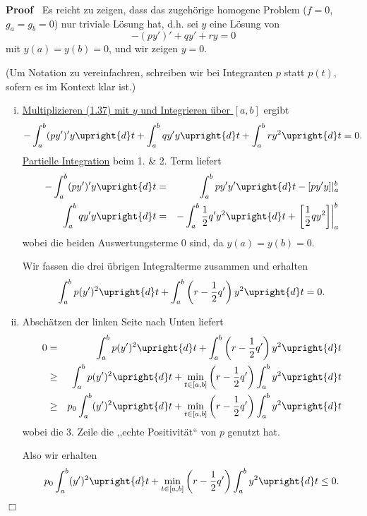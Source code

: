\documentclass{book}
\newcommand{\nobracket}{}
\newenvironment{enumerateroman}{\begin{enumerate}[i.] }{\end{enumerate}}
\newenvironment{proof}{\noindent\textbf{Proof\ }}{\hspace*{\fill}$\Box$\medskip}
\begin{document}
\begin{proof}
  Es reicht zu zeigen, dass das zugeh{\"o}rige homogene Problem ($f = 0$, $g_a
  = g_b = 0$) nur triviale L{\"o}sung hat, d.h. sei $y$ eine L{\"o}sung von
  \begin{equation}
    - (p y')' + q y' + r y = 0
  \end{equation}
  mit $y (a) = y (b) = 0$, und wir zeigen $y = 0$.
  
  (Um Notation zu vereinfachren, schreiben wir bei Integranten $p$ statt $p
  (t)$, sofern es im Kontext klar ist.)
  \begin{enumerateroman}
    \item {\underline{Multiplizieren (1.37) mit $y$ und Integrieren {\"u}ber
    $[a, b]$}} ergibt
    \[ - \int_a^b (p y')' y \upright{d} t + \int_a^b q y' y \upright{d} t +
       \int_a^b r y^2 \upright{d} t = 0. \]
    {\hspace{1.7em}}{\underline{Partielle Integration}} beim 1. \& 2. Term
    liefert
    \begin{eqnarray*}
      - \int_a^b (p y')' y \upright{d} t & = & \int_a^b p y' y' \upright{d} t
      - [p y' y] | \nobracket_a^b\\
      \int_a^b q y' y \upright{d} t & = & - \int_a^b \frac{1}{2} q' y^2
      \upright{d} t + \left. \left[ \frac{1}{2} q y^2 \right] \right|_a^b
    \end{eqnarray*}
    wobei die beiden Auswertungsterme $0$ sind, da $y (a) = y (b) = 0$.
    
    Wir fassen die drei {\"u}brigen Integralterme zusammen und erhalten
    \[ \int_a^b p (y')^2 \upright{d} t + \int_a^b \left( r - \frac{1}{2} q'
       \right) y^2 \upright{d} t = 0. \]
    \item Absch{\"a}tzen der linken Seite nach Unten liefert
    \begin{eqnarray*}
      0 & = & \int_a^b p (y')^2 \upright{d} t + \int_a^b \left( r -
      \frac{1}{2} q' \right) y^2 \upright{d} t\\
      & \geq & \int_a^b p (y')^2 \upright{d} t + \min_{t \in [a, b]} \left( r
      - \frac{1}{2} q' \right) \int_a^b y^2 \upright{d} t\\
      & \geq & p_0 \int_a^b (y')^2 \upright{d} t + \min_{t \in [a, b]} \left(
      r - \frac{1}{2} q' \right) \int_a^b y^2 \upright{d} t
    \end{eqnarray*}
    wobei die 3. Zeile die ,,echte Positivit{\"a}t`` von $p$ genutzt hat.
    
    Also wir erhalten
    \begin{equation}
      p_0 \int_a^b (y')^2 \upright{d} t + \min_{t \in [a, b]} \left( r -
      \frac{1}{2} q' \right) \int_a^b y^2 \upright{d} t \leq 0.
    \end{equation}
    

\end{enumerateroman}
\end{proof}
\end{document}
